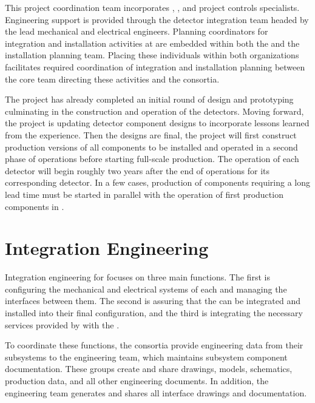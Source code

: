 This project coordination team incorporates , 
, and project controls specialists.  Engineering support 
is provided through the  detector integration team 
headed by the lead  mechanical and electrical engineers.
Planning coordinators for integration and installation activities 
at  are embedded within both the  and the 
 installation planning team.  Placing 
these individuals within both organizations facilitates required 
coordination of integration and installation planning 
between the core team directing these activities and the 
 consortia. %

The  project has already completed an initial round of design 
and prototyping culminating in the construction and operation 
of the  detectors.  Moving forward, the project is 
updating detector component designs to incorporate lessons learned from 
the  experience.  Then the designs are final, the 
project will first construct production versions of all components to be installed and operated in a second phase of  
operations before starting full-scale production.  The operation 
of each  detector will begin roughly two years after
the end of operations for its corresponding  detector.
In a few cases, production of components requiring a long lead time must 
be started in parallel with the operation of first production components 
in .

\section{Integration Engineering}
\label{sec:es-coord-integ-sysengr}

Integration engineering for  focuses on three main functions. The first is configuring the
mechanical and electrical systems of each  and managing
the interfaces between them.  The second 
is assuring that the  can be integrated and
installed into their final configuration, and the third is
integrating the necessary services provided by  
with the . 

To coordinate these functions, the consortia provide engineering data from their
subsystems to the  engineering team, which maintains subsystem
component documentation.  
These groups create and share
drawings, models, schematics, production data, and all other
engineering documents. In addition, the  engineering team
generates and shares all interface drawings and documentation.
 
